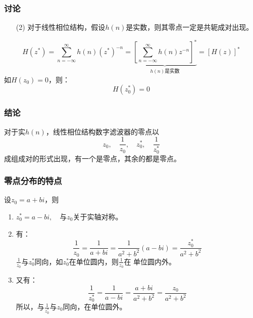 \documentclass[notheorems,compress,mathserif,table]{beamer}
\begin{document}
\begin{frame}[shrink]\frametitle{讨论}%
\begin{enumerate}
  \item [(2)] 对于线性相位结构，假设$h(n)$是实数，则其零点一定是共轭成对出现。
\end{enumerate}

$$H(z^{*}) = \sum_{n=-\infty}^{\infty}h(n)(z^{*})^{-n}
= \underbrace{ \left[\sum_{n=-\infty}^{\infty}h(n)z^{-n}\right]^*}_{\mbox{$h(n)$是实数}}
= \left[H(z)\right]^{*}$$
如$H(z_0)=0$，则：
$$H(z_0^*) = 0$$
\end{frame}
\begin{frame}[shrink]\frametitle{结论}%
对于实$h(n)$，线性相位结构数字滤波器的零点以
$$z_0,\quad\frac{1}{z_0},\quad z_0^*,\quad\frac{1}{z_0^*}$$
成组成对的形式出现，有一个是零点，其余的都是零点。
\end{frame}
\begin{frame}[shrink]\frametitle{零点分布的特点}%
设$z_0= a+bi$，则
\begin{enumerate}
\item
$z_0^* = a-bi,\quad$与$z_0$关于实轴对称。
\item 有：
$$\frac{1}{z_0} = \frac{1}{a+bi} = \frac{1}{a^2+b^2}(a-bi)=
\frac{z_0^*}{a^2+b^2}$$
$\frac{1}{z_0}$与$z_0^*$同向，如$z_0^*$在单位圆内，则$\frac{1}{z_0}$在
单位圆内外。
\item 又有：
$$\frac{1}{z_0^*} = \frac{1}{a-bi} = \frac{a+bi}{a^2+b^2}
= \frac{z_0}{a^2+b^2}$$
所以，与$\frac{1}{z_0^*}$与$z_0$同向，在单位圆外。
\end{enumerate}
\end{frame}
\end{document}
